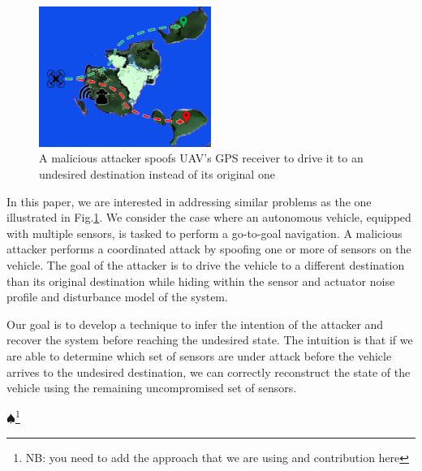 \documentclass[conference]{IEEEtran}
\newcommand\NB[1]{$\spadesuit$\footnote{NB: #1}}
\begin{document}
\begin{figure}[h]
\centering
\includegraphics[width=0.5\textwidth]{problem}
\caption{A malicious attacker spoofs UAV's  GPS receiver to drive it to an undesired destination instead of its original one}
 \label{fig:problem}
\end{figure}

In this paper, we are interested in addressing similar problems as the one illustrated in Fig.\ref{fig:problem}. We consider the case where an autonomous vehicle, equipped with multiple sensors, is tasked to perform a go-to-goal navigation. 
A malicious attacker performs a coordinated attack by spoofing one or more of sensors on the vehicle. The goal of the attacker is to drive the vehicle to a different destination than its original destination while hiding within the sensor and actuator noise profile and disturbance model of the system. 

Our goal is to develop a technique to infer the intention of the attacker and recover the system before reaching the undesired state. 
The intuition is that if we are able to determine which set of sensors are under attack before the vehicle arrives to the undesired destination, we can correctly reconstruct the state of the vehicle using the remaining uncompromised set of sensors. 

\NB{you need to add the approach that we are using and contribution here}
\end{document}

